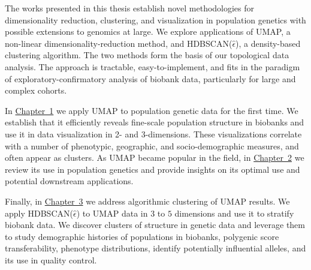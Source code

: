 The works presented in this thesis establish novel methodologies for dimensionality reduction, clustering, and visualization in population genetics with possible extensions to genomics at large. We explore applications of UMAP, a non-linear dimensionality-reduction method, and HDBSCAN($\hat{\epsilon}$), a density-based clustering algorithm. The two methods form the basis of our topological data analysis. The approach is tractable, easy-to-implement, and fits in the paradigm of exploratory-confirmatory analysis of biobank data, particularly for large and complex cohorts.

In \hyperref[chap:chapter1]{Chapter~1} we apply UMAP to population genetic data for the first time. We establish that it efficiently reveals fine-scale population structure in biobanks and use it in data visualization in 2- and 3-dimensions. These visualizations correlate with a number of phenotypic, geographic, and socio-demographic measures, and often appear as clusters. As UMAP became popular in the field, in \hyperref[chap:chapter2]{Chapter~2} we review its use in population genetics and provide insights on its optimal use and potential downstream applications.

Finally, in \hyperref[chap:chapter3]{Chapter~3} we address algorithmic clustering of UMAP results. We apply HDBSCAN($\hat{\epsilon}$) to UMAP data in $3$ to $5$ dimensions and use it to stratify biobank data. We discover clusters of structure in genetic data and leverage them to study demographic histories of populations in biobanks, polygenic score transferability, phenotype distributions, identify potentially influential alleles, and its use in quality control.